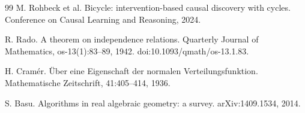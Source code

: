 \documentclass{article}
\begin{document}
\begin{thebibliography}{99}
   M. Rohbeck et al. Bicycle: intervention-based causal discovery with cycles. Conference on Causal Learning and Reasoning, 2024.

   R. Rado. A theorem on independence relations. Quarterly Journal of Mathematics, os-13(1):83--89, 1942. doi:10.1093/qmath/os-13.1.83.

   H. Cramér. Über eine Eigenschaft der normalen Verteilungsfunktion. Mathematische Zeitschrift, 41:405--414, 1936.

   S. Basu. Algorithms in real algebraic geometry: a survey. arXiv:1409.1534, 2014.

\end{thebibliography}
\end{document}
